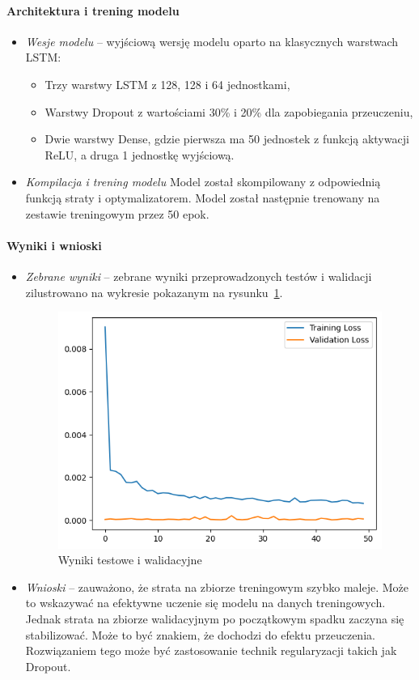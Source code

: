 \paragraph{Architektura i trening modelu}
\begin{itemize}
\item \emph{Wesje modelu} -- wyjściową wersję modelu oparto na klasycznych warstwach LSTM:
\begin{itemize}
    \item Trzy warstwy LSTM z 128, 128 i 64 jednostkami,
    \item Warstwy Dropout z wartościami 30\% i 20\% dla zapobiegania przeuczeniu,
    \item Dwie warstwy Dense, gdzie pierwsza ma 50 jednostek z funkcją aktywacji ReLU, a druga 1 jednostkę wyjściową.
\end{itemize}
\item \emph{Kompilacja i trening modelu}
Model został skompilowany z odpowiednią funkcją straty i optymalizatorem. Model został następnie trenowany na zestawie treningowym przez 50 epok.
\end{itemize}

\paragraph{Wyniki i wnioski}
\begin{itemize}
\item \emph{Zebrane wyniki} -- zebrane wyniki przeprowadzonych testów i walidacji zilustrowano na wykresie pokazanym na rysunku~\ref{fig:Wyniki_testowe_i_walidacyjne}.
\begin{figure}[htb]
    \centering
    \includegraphics[width=0.8\linewidth]{Wyniki_testowe_i_walidacyjne.png}
    \caption{Wyniki testowe i walidacyjne}
    \label{fig:Wyniki_testowe_i_walidacyjne}
\end{figure}
\item \emph{Wnioski} -- zauważono, że strata na zbiorze treningowym szybko maleje. Może to wskazywać na efektywne uczenie się modelu na danych treningowych. Jednak strata na zbiorze walidacyjnym po początkowym spadku zaczyna się stabilizować. Może to być znakiem, że dochodzi do efektu przeuczenia. Rozwiązaniem tego może być zastosowanie technik regularyzacji takich jak Dropout.
\end{itemize}


